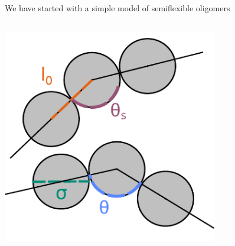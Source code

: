 \documentclass[aspectratio=169]{beamer}
\begin{document}
\begin{frame}[c]{We have started with a simple model of semiflexible oligomers}
\begin{columns}[T]
       {\includegraphics[width=0.95\textwidth]{../figures/fig-hard_tang_step_model/fig-stiff_PE.pdf}}

  \end{columns}
\end{frame}
\end{document}
